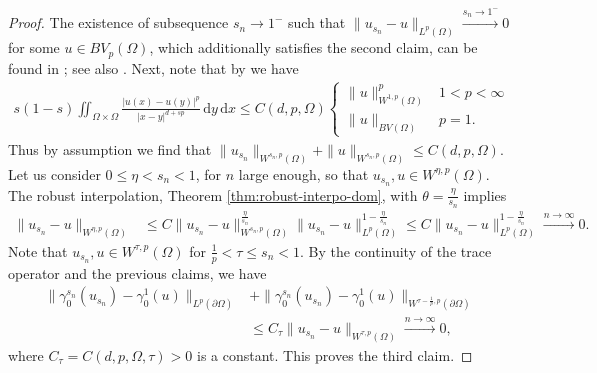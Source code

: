 \documentclass[12pt, reqno]{amsart}%
\theoremstyle{plain}  %
\theoremstyle{definition}  %
\theoremstyle{remark}
\numberwithin{equation}{section}
\renewcommand{\d}{\,\mathrm{d}}
\begin{document}
\begin{proof}
The existence of subsequence $s_n\to 1^-$ such that $ \|u_{s_n}-u\|_{L^p(\Omega)}\xrightarrow{s_n\to 1^-}0$ for some $u\in BV_p(\Omega)$, which additionally satisfies the second claim,  can be found in \cite[Theorem 1.2]{Pon04}; see also \cite{BBM01}.  Next, note that by  \cite[Lemma 2.12]{Fog23} we have
\begin{align}\label{eq:xxuniform-bound}
s(1-s)
\iint_{\Omega \times \Omega} \frac{|u(x)-u(y)|^p}{|x-y|^{d+sp}} \d y\d x\leq C(d,p,\Omega)
\begin{cases}
\|u\|^p_{W^{1,p}(\Omega)}&1<p<\infty\\
\|u\|_{BV(\Omega)} &p=1.
\end{cases}
\end{align}
Thus by assumption we find that $\|u_{s_n}\|_{W^{s_n,p}(\Omega)}+\|u\|_{W^{s_n,p}(\Omega)}\leq C(d,p,\Omega)$. Let us consider $0\leq \eta < s_n <1$, for $n$ large enough, so that $u_{s_n}, u \in W^{\eta,p}(\Omega)$. The robust interpolation, Theorem \ref{thm:robust-interpo-dom}, with $\theta=\frac{\eta}{s_n}$ implies 
\begin{align*}
\|u_{s_n}-u\|_{W^{\eta,p}(\Omega)}
&\leq C \|u_{s_n}-u\|^{\frac{\eta}{s_n}}_{W^{s_n,p}(\Omega)} \|u_{s_n}-u\|^{1-\frac{\eta}{s_n}}_{L^{p}(\Omega)} \leq C \|u_{s_n}-u\|^{1-\frac{\eta}{s_n}}_{L^{p}(\Omega)} \xrightarrow{n\to\infty} 0.
\end{align*}
Note that $u_{s_n}, u \in W^{\tau,p}(\Omega)$ for $\frac{1}{p} < \tau \le s_n < 1$. By the continuity of the trace operator and the previous claims, we have
\begin{align*}
\|\gamma^{s_n}_0(u_{s_n}) - \gamma^1_0(u)\|_{L^p(\partial \Omega)}
&+ \|\gamma^{s_n}_0(u_{s_n}) - \gamma^1_0(u)\|_{W^{\tau-\frac{1}{p},p}(\partial \Omega)} \\
&\leq C_\tau \|u_{s_n} - u\|_{W^{\tau,p}(\Omega)} \xrightarrow{n \to \infty} 0,
\end{align*}
where $C_\tau = C(d,p,\Omega,\tau) > 0$ is a constant. This proves the third claim.
\end{proof}
\end{document}
